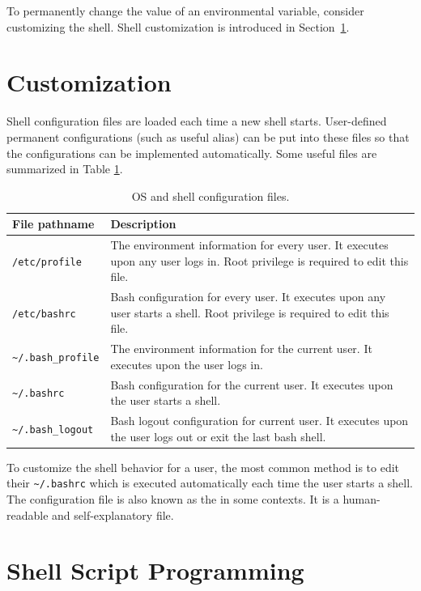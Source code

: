 To permanently change the value of an environmental variable, consider customizing the shell. Shell customization is introduced in Section~\ref{ch:sb:subsec:customizeshell}.

\section{Customization} \label{ch:sb:subsec:customizeshell}

Shell configuration files are loaded each time a new shell starts. User-defined permanent configurations (such as useful alias) can be put into these files so that the configurations can be implemented automatically. Some useful files are summarized in Table \ref{ch:sb:tab:shellconfig}.

\begin{table}[!htb]
	\centering \caption{OS and shell configuration files.}\label{ch:sb:tab:shellconfig}
	\begin{tabularx}{\textwidth}{lX}
		\hline
		File pathname & Description \\ \hline
		\verb|/etc/profile| & The environment information for every user. It executes upon any user logs in. Root privilege is required to edit this file.  \\ 
		\verb|/etc/bashrc| & Bash configuration for every user. It executes upon any user starts a shell. Root privilege is required to edit this file. \\ 
		\verb|~/.bash_profile| & The environment information for the current user. It executes upon the user logs in. \\ 
		\verb|~/.bashrc| & Bash configuration for the current user. It executes upon the user starts a shell. \\ 
		\verb|~/.bash_logout| & Bash logout configuration for current user. It executes upon the user logs out or exit the last bash shell. \\ \hline
	\end{tabularx}
\end{table}

To customize the shell behavior for a user, the most common method is to edit their \verb|~/.bashrc| which is executed automatically each time the user starts a shell. The configuration file is also known as the  in some contexts. It is a human-readable and self-explanatory file.

\section{Shell Script Programming}


